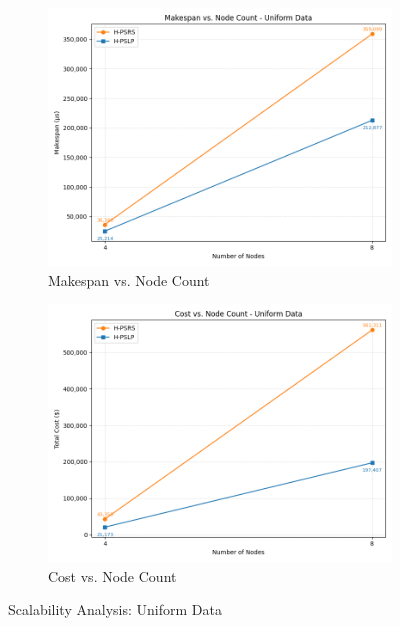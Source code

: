 \documentclass[]{interact}
\theoremstyle{plain}
\theoremstyle{definition}
\theoremstyle{remark}
\begin{document}
\begin{figure}[H]
    \centering
    \begin{subfigure}{0.48\textwidth}
        \includegraphics[width=\textwidth]{src/out_matplotlib_charts/scale_makespan_uniform_nodes.png}
        \caption{Makespan vs. Node Count}
        \label{fig:m6}
    \end{subfigure}
    \hfill
    \begin{subfigure}{0.48\textwidth}
        \includegraphics[width=\textwidth]{src/out_matplotlib_charts/scale_cost_uniform_nodes.png}
        \caption{Cost vs. Node Count}
        \label{fig:m7}
    \end{subfigure}
    \caption{Scalability Analysis: Uniform Data}
    \label{fig:scale_uniform}
\end{figure}
\end{document}

